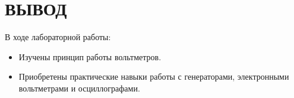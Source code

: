 \section{ВЫВОД}
\vspace{4mm}
В ходе лабораторной работы:
\begin{itemize}\itemsep1pt \parskip0pt 
\item
  Изучены принцип работы вольтметров.
\item
Приобретены  практические навыки работы с генераторами, электронными вольтметрами и осциллографами.
\end{itemize}

\clearpage